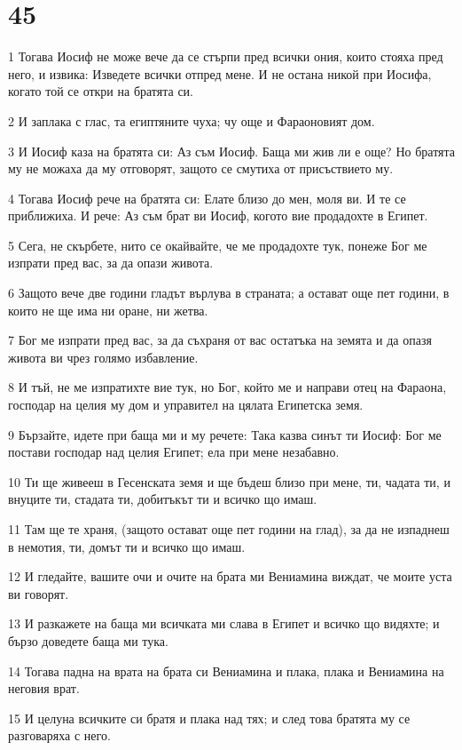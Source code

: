 \chapter{45}

\par 1 Тогава Иосиф не може вече да се стърпи пред всички ония, които стояха пред него, и извика: Изведете всички отпред мене. И не остана никой при Иосифа, когато той се откри на братята си.
\par 2 И заплака с глас, та египтяните чуха; чу още и Фараоновият дом.
\par 3 И Иосиф каза на братята си: Аз съм Иосиф. Баща ми жив ли е още? Но братята му не можаха да му отговорят, защото се смутиха от присъствието му.
\par 4 Тогава Иосиф рече на братята си: Елате близо до мен, моля ви. И те се приближиха. И рече: Аз съм брат ви Иосиф, когото вие продадохте в Египет.
\par 5 Сега, не скърбете, нито се окайвайте, че ме продадохте тук, понеже Бог ме изпрати пред вас, за да опази живота.
\par 6 Защото вече две години гладът върлува в страната; а остават още пет години, в които не ще има ни оране, ни жетва.
\par 7 Бог ме изпрати пред вас, за да съхраня от вас остатъка на земята и да опазя живота ви чрез голямо избавление.
\par 8 И тъй, не ме изпратихте вие тук, но Бог, който ме и направи отец на Фараона, господар на целия му дом и управител на цялата Египетска земя.
\par 9 Бързайте, идете при баща ми и му речете: Така казва синът ти Иосиф: Бог ме постави господар над целия Египет; ела при мене незабавно.
\par 10 Ти ще живееш в Гесенската земя и ще бъдеш близо при мене, ти, чадата ти, и внуците ти, стадата ти, добитъкът ти и всичко що имаш.
\par 11 Там ще те храня, (защото остават още пет години на глад), за да не изпаднеш в немотия, ти, домът ти и всичко що имаш.
\par 12 И гледайте, вашите очи и очите на брата ми Вениамина виждат, че моите уста ви говорят.
\par 13 И разкажете на баща ми всичката ми слава в Египет и всичко що видяхте; и бързо доведете баща ми тука.
\par 14 Тогава падна на врата на брата си Вениамина и плака, плака и Вениамина на неговия врат.
\par 15 И целуна всичките си братя и плака над тях; и след това братята му се разговаряха с него.
